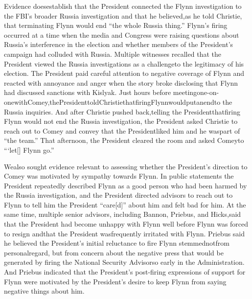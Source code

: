 Evidence doesestablish that the President connected the Flynn investigation to the FBI’s broader Russia investigation and that he believed,as he told Christie, that terminating Flynn would end “the whole Russia thing.”
Flynn’s firing occurred at a time when the media and Congress were raising questions about Russia’s interference in the election and whether members of the President’s campaign had colluded with Russia.
Multiple witnesses recalled that the President viewed the Russia investigations as a challengeto the legitimacy of his election.
The President paid careful attention to negative coverage of Flynn and reacted with annoyance and anger when the story broke disclosing that Flynn had discussed sanctions with Kislyak.
Just hours before meetingone-on-onewithComey,thePresidenttoldChristiethatfiringFlynnwouldputanendto the Russia inquiries.
And after Christie pushed back,telling the Presidentthatfiring Flynn would not end the Russia investigation, the President asked Christie to reach out to Comey and convey that the Presidentliked him and he waspart of “the team.”
That afternoon, the President cleared the room and asked Comeyto “‘let[] Flynn go.”

Wealso sought evidence relevant to assessing whether the President’s direction to Comey was motivated by sympathy towards Flynn.
In public statements the President repeatedly described Flynn as a good person who had been harmed by the Russia investigation, and the President directed advisors to reach out to Flynn to tell him the President “care[d]” about him and felt bad for him.
At the same time, multiple senior advisors, including Bannon, Priebus, and Hicks,said that the President had become unhappy with Flynn well before Flynn was forced to resign andthat the President wasfrequently irritated with Flynn.
Priebus said he believed the President’s initial reluctance to fire Flynn stemmednotfrom personalregard, but from concern about the negative press that would be generated by firing the National Security Advisorso early in the Administration.
And Priebus indicated that the President’s post-firing expressions of support for Flynn were motivated by the President’s desire to keep Flynn from saying negative things about him.

